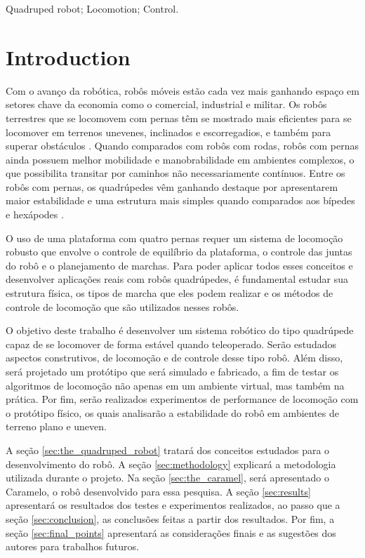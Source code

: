 \documentclass[conference]{IEEEtran}
\begin{document}
\begin{IEEEkeywords}
  Quadruped robot; Locomotion; Control.
\end{IEEEkeywords}

\section{Introduction}
Com o avanço da robótica, robôs móveis estão cada vez mais ganhando espaço em setores chave da economia como o comercial, industrial e militar. Os robôs terrestres que se locomovem com pernas têm se mostrado mais eficientes para se locomover em terrenos unevenes, inclinados e escorregadios, e também para superar obstáculos \cite{X.134}. Quando comparados com robôs com rodas, robôs com pernas ainda possuem melhor mobilidade e manobrabilidade em ambientes complexos, o que possibilita transitar por caminhos não necessariamente contínuos. Entre os robôs com pernas, os quadrúpedes vêm ganhando destaque por apresentarem maior estabilidade e uma estrutura mais simples quando comparados aos bípedes e hexápodes \cite{Shi2021}.

O uso de uma plataforma com quatro pernas requer um sistema de locomoção robusto que envolve o controle de equilíbrio da plataforma, o controle das juntas do robô e o planejamento de marchas. Para poder aplicar todos esses conceitos e desenvolver aplicações reais com robôs quadrúpedes, é fundamental estudar sua estrutura física, os tipos de marcha que eles podem realizar e os métodos de controle de locomoção que são utilizados nesses robôs.

O objetivo deste trabalho é desenvolver um sistema robótico do tipo quadrúpede capaz de se locomover de forma estável quando teleoperado. Serão estudados aspectos construtivos, de locomoção e de controle desse tipo robô. Além disso, será projetado um protótipo que será simulado e fabricado, a fim de testar os algoritmos de locomoção não apenas em um ambiente virtual, mas também na prática. Por fim, serão realizados experimentos de performance de locomoção com o protótipo físico, os quais analisarão a estabilidade do robô em ambientes de terreno plano e uneven.

A seção \ref{sec:the_quadruped_robot} tratará dos conceitos estudados para o desenvolvimento do robô. A seção \ref{sec:methodology} explicará a metodologia utilizada durante o projeto. Na seção \ref{sec:the_caramel}, será apresentado o Caramelo, o robô desenvolvido para essa pesquisa. A seção \ref{sec:results} apresentará os resultados dos testes e experimentos realizados, ao passo que a seção \ref{sec:conclusion}, as conclusões feitas a partir dos resultados. Por fim, a seção \ref{sec:final_points} apresentará as considerações finais e as sugestões dos autores para trabalhos futuros.
\end{document}
